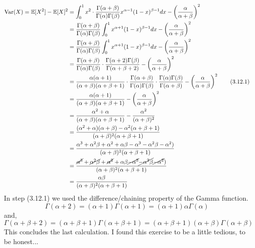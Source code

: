 \begin{align*}
    \text{Var}(X) = \mathbb{E}[X^2] - \mathbb{E}[X]^2 &= 
    \int_0^1 x^2\cdot\frac{\Gamma(\alpha + \beta)}{\Gamma(\alpha)\Gamma(\beta)}x^{\alpha - 1}(1 - x)^{\beta-1}dx - \left(\frac{\alpha}{\alpha + \beta}\right)^2 \\
    &= \frac{\Gamma(\alpha + \beta)}{\Gamma(\alpha)\Gamma(\beta)}\int_0^1 x^{\alpha + 1}(1 - x)^{\beta-1}dx - \left(\frac{\alpha}{\alpha + \beta}\right)^2 \\
    &= \frac{\Gamma(\alpha + \beta)}{\Gamma(\alpha)\Gamma(\beta)}\int_0^1 x^{\alpha + 1}(1 - x)^{\beta-1}dx - \left(\frac{\alpha}{\alpha + \beta}\right)^2\\
    &= \frac{\Gamma(\alpha + \beta)}{\Gamma(\alpha)\Gamma(\beta)}\cdot\frac{\Gamma(\alpha + 2)\Gamma(\beta)}{\Gamma(\alpha + \beta + 2)} - \left(\frac{\alpha}{\alpha + \beta}\right)^2 \\
    &= \frac{\alpha(\alpha + 1)}{(\alpha + \beta)(\alpha + \beta + 1)}\cdot\frac{\Gamma(\alpha + \beta)}{\Gamma(\alpha)\Gamma(\beta)}\cdot\frac{\Gamma(\alpha)\Gamma(\beta)}{\Gamma(\alpha + \beta)} - \left(\frac{\alpha}{\alpha + \beta}\right)^2 \tag{3.12.1} \\
    &= \frac{\alpha(\alpha + 1)}{(\alpha + \beta)(\alpha + \beta + 1)} - \left(\frac{\alpha}{\alpha + \beta}\right)^2 \\
    &= \frac{\alpha^2 + \alpha}{(\alpha + \beta)(\alpha + \beta + 1)} - \frac{\alpha^2}{(\alpha + \beta)^2} \\
    &= \frac{(\alpha^2 + \alpha)(\alpha + \beta) - \alpha^2(\alpha + \beta + 1)}{(\alpha + \beta)^2(\alpha + \beta + 1)} \\
    &= \frac{\alpha^3 + \alpha^2\beta + \alpha^2 + \alpha\beta - \alpha^3 - \alpha^2\beta - \alpha^2)}{(\alpha + \beta)^2(\alpha + \beta + 1)} \\
    &= \frac{\cancel{\alpha^3} + \cancel{\alpha^2\beta} + \cancel{\alpha^2} + \alpha\beta \cancel{- \alpha^3} \cancel{- \alpha^2\beta} \cancel{- \alpha^2})}{(\alpha + \beta)^2(\alpha + \beta + 1)} \\
    &= \frac{\alpha\beta}{(\alpha + \beta)^2(\alpha + \beta + 1)}
\end{align*}
In step (3.12.1) we used the difference/chaining property of the Gamma function.
$$
\Gamma(\alpha + 2) = (\alpha + 1)\Gamma(\alpha + 1) = (\alpha + 1)\alpha\Gamma(\alpha)
$$
and,
$$
\Gamma(\alpha + \beta + 2) = (\alpha + \beta + 1)\Gamma(\alpha + \beta + 1) =
(\alpha + \beta + 1)(\alpha + \beta)\Gamma(\alpha + \beta)
$$
This concludes the last calculation. I found this exercise to be a little tedious, to be honest...

